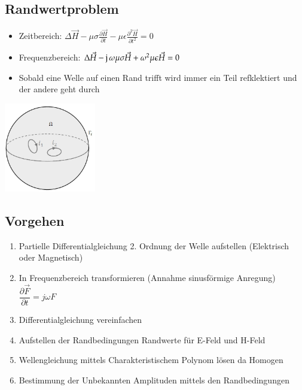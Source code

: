 \subsection{Randwertproblem}
\begin{minipage}{9cm}
	\begin{itemize}
		\item Zeitbereich: $\Delta\vec{H}-\mu\sigma\frac{\partial \vec{H}}{\partial t}-\mu\epsilon\frac{\partial^{2}\vec{H}}{\partial t^{2}}=0$
		\item Frequenzbereich: $\Delta \vec{H}-\imaginär\omega\mu\sigma\vec{H}+\omega^{2}\mu\epsilon\vec{H}=0$
		\item Sobald eine Welle auf einen Rand trifft wird immer ein Teil refklektiert und der andere geht durch
	\end{itemize}	
\end{minipage}
\begin{minipage}{8cm}
	\includegraphics[width=4cm]{images/Randwertproblem.jpg}
\end{minipage}
\subsection{Vorgehen}
	\begin{enumerate}
		\item Partielle Differentialgleichung 2. Ordnung der Welle aufstellen (Elektrisch oder Magnetisch)
		\item In Frequenzbereich transformieren (Annahme sinusförmige Anregung)
		\subitem $\dfrac{\partial \vec{F}}{\partial t}= j\omega F $
		\item Differentialgleichung vereinfachen
		\item Aufstellen der Randbedingungen
		\subitem Randwerte für E-Feld und H-Feld
		\item Wellengleichung mittels Charakteristischem Polynom lösen da Homogen
		\item Bestimmung der Unbekannten Amplituden mittels den Randbedingungen
	\end{enumerate}
\clearpage
\pagebreak
